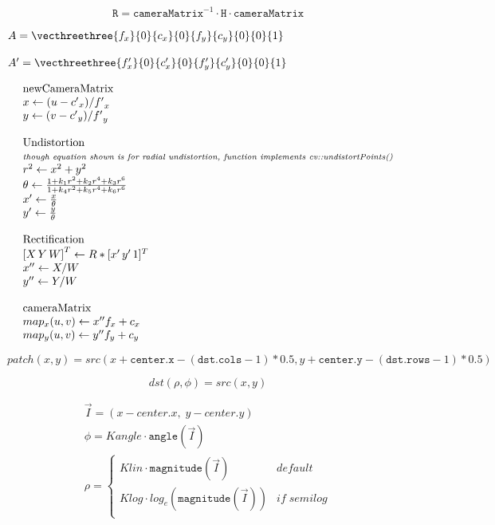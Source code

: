 \documentclass{article}
\begin{document}
\[\texttt{R} = \texttt{cameraMatrix} ^{-1} \cdot \texttt{H} \cdot \texttt{cameraMatrix}\]
\pagebreak

$A=\vecthreethree{f_x}{0}{c_x}{0}{f_y}{c_y}{0}{0}{1}$
\pagebreak

$A'=\vecthreethree{f_x'}{0}{c_x'}{0}{f_y'}{c_y'}{0}{0}{1}$
\pagebreak

\[\begin{array}{l}
\text{newCameraMatrix}\\
x  \leftarrow (u - {c'}_x)/{f'}_x  \\
y  \leftarrow (v - {c'}_y)/{f'}_y  \\

\\\text{Undistortion}
\\\scriptsize{\textit{though equation shown is for radial undistortion, function implements cv::undistortPoints()}}\\
r^2  \leftarrow x^2 + y^2 \\
\theta \leftarrow \frac{1 + k_1 r^2 + k_2 r^4 + k_3 r^6}{1 + k_4 r^2 + k_5 r^4 + k_6 r^6}\\
x' \leftarrow \frac{x}{\theta} \\
y'  \leftarrow \frac{y}{\theta} \\

\\\text{Rectification}\\
{[X\,Y\,W]} ^T  \leftarrow R*[x' \, y' \, 1]^T  \\
x''  \leftarrow X/W  \\
y''  \leftarrow Y/W  \\

\\\text{cameraMatrix}\\
map_x(u,v)  \leftarrow x'' f_x + c_x  \\
map_y(u,v)  \leftarrow y'' f_y + c_y
\end{array}
\]
\pagebreak

\[patch(x, y) = src(x +  \texttt{center.x} - ( \texttt{dst.cols} -1)*0.5, y +  \texttt{center.y} - ( \texttt{dst.rows} -1)*0.5)\]
\pagebreak

\[dst(\rho , \phi ) = src(x,y)
\]
\pagebreak

\[\begin{array}{l}
\vec{I} = (x - center.x, \;y - center.y) \\
\phi = Kangle \cdot \texttt{angle} (\vec{I}) \\
\rho = \left\{\begin{matrix}
Klin \cdot \texttt{magnitude} (\vec{I}) & default \\
Klog \cdot log_e(\texttt{magnitude} (\vec{I})) & if \; semilog \\
\end{matrix}\right.
\end{array}
\]
\pagebreak
\end{document}
